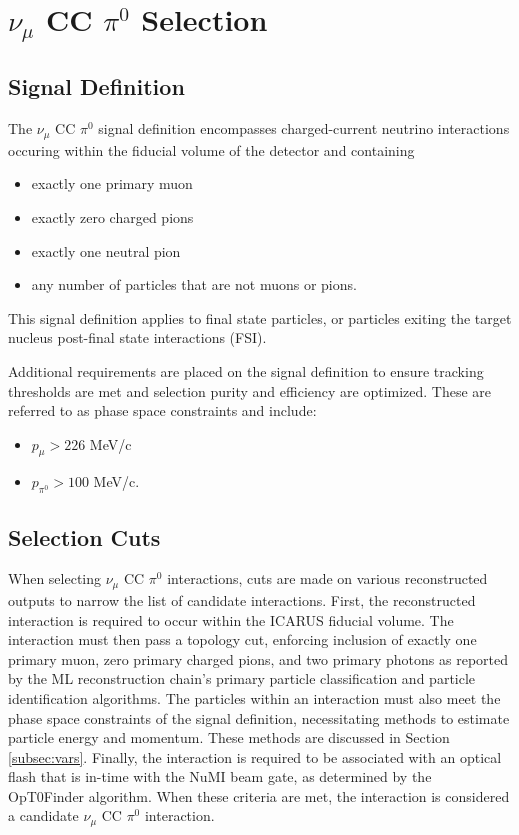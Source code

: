 \documentclass[../main.tex]{subfiles}
\begin{document}
\section{$\nu_{\mu}$ CC $\pi^{0}$ Selection}
\label{sec:selection}


\subsection{Signal Definition}
The $\nu_{\mu}$ CC $\pi^{0}$ signal definition encompasses charged-current neutrino interactions occuring within the fiducial volume of the detector and containing
\begin{itemize}
    \item exactly one primary muon
    \item exactly zero charged pions
    \item exactly one neutral pion
    \item any number of particles that are not muons or pions.
\end{itemize}
This signal definition applies to final state particles, or particles exiting the target nucleus post-final state interactions (FSI).

Additional requirements are placed on the signal definition to ensure tracking thresholds are met and selection purity and efficiency are optimized.  These are referred to as phase space constraints and include:
\begin{itemize}
    \item $p_{\mu} > 226$ MeV/c
    \item $p_{\pi^{0}} > 100$ MeV/c.
\end{itemize}

\subsection{Selection Cuts}
When selecting $\nu_{\mu}$ CC $\pi^{0}$ interactions, cuts are made on various reconstructed outputs to narrow the list of candidate interactions.  First, the reconstructed interaction is required to occur within the ICARUS fiducial volume.  The interaction must then pass a topology cut, enforcing inclusion of exactly one primary muon, zero primary charged pions, and two primary photons as reported by the ML reconstruction chain's primary particle classification and particle identification algorithms.  The particles within an interaction must also meet the phase space constraints of the signal definition, necessitating methods to estimate particle energy and momentum.  These methods are discussed in Section \ref{subsec:vars}.  Finally, the interaction is required to be associated with an optical flash that is in-time with the NuMI beam gate, as determined by the OpT0Finder algorithm.  When these criteria are met, the interaction is considered a candidate $\nu_{\mu}$ CC $\pi^{0}$ interaction.
\end{document}
